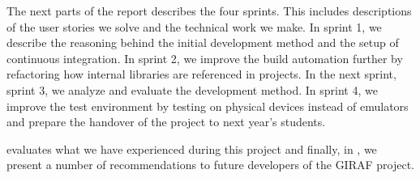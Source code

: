 The next parts of the report describes the four sprints. This includes descriptions of the user stories we solve and the technical work we make. In sprint 1, we describe the reasoning behind the initial development method and the setup of continuous integration. In sprint 2, we improve the build automation further by refactoring how internal libraries are referenced in projects. In the next sprint, sprint 3, we analyze and evaluate the development method. In sprint 4, we improve the test environment by testing on physical devices instead of emulators and prepare the handover of the project to next year's students.

 evaluates what we have experienced during this project and finally, in , we present a number of recommendations to future developers of the GIRAF project.